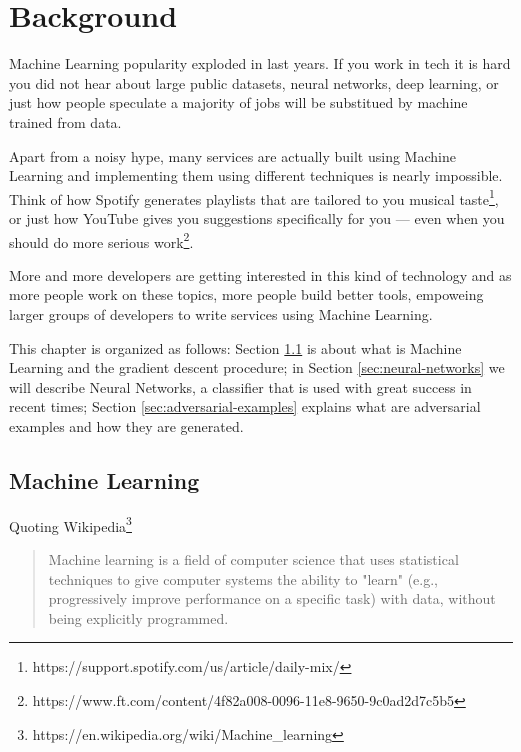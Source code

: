 \chapter{Background}
\label{ch:background}

Machine Learning popularity exploded in last years. If you work in tech
it is hard you did not hear about large public datasets, neural
networks, deep learning, or just how people speculate a majority of
jobs will be substitued by machine trained from data.

Apart from a noisy hype, many services are actually built using Machine
Learning and implementing them using different techniques is nearly
impossible. Think of how Spotify generates playlists that are tailored
to you musical
taste\footnote{https://support.spotify.com/us/article/daily-mix/}, or
just how YouTube gives you suggestions specifically for you
\cite{45530} --- even when you should do more serious
work\footnote{https://www.ft.com/content/4f82a008-0096-11e8-9650-9c0ad2d7c5b5}.

More and more developers are getting interested in this kind of
technology and as more people work on these topics, more people build
better tools, empoweing larger groups of developers to write
services using Machine Learning.

This chapter is organized as follows: Section
\ref{sec:machine-learning} is about what is Machine Learning and the
gradient descent procedure; in Section \ref{sec:neural-networks} we will
describe Neural Networks, a classifier that is used with great success
in recent times; Section \ref{sec:adversarial-examples} explains what
are adversarial examples and how they are generated.

\section{Machine Learning}
\label{sec:machine-learning}

Quoting
Wikipedia\footnote{https://en.wikipedia.org/wiki/Machine\_learning}

\begin{quote}
Machine learning is a field of computer science that uses statistical
techniques to give computer systems the ability to "learn" (e.g.,
progressively improve performance on a specific task) with data,
without being explicitly programmed.
\end{quote}


